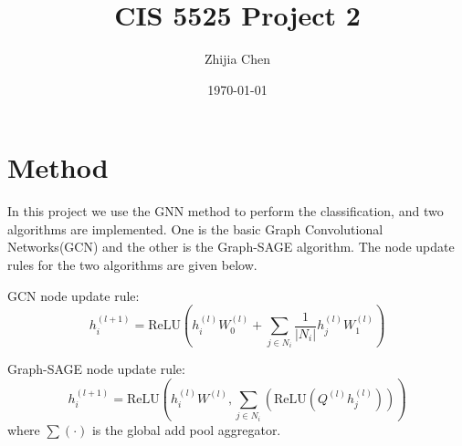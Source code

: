 \documentclass{article}
\title{CIS 5525 Project 2}
\author{Zhijia Chen}
\date{\today}
\begin{document}
\begin{titlepage}
    \maketitle
\end{titlepage}

\section{Method}

In this project we use the GNN method to perform the classification, and two algorithms are implemented. One is the basic Graph Convolutional Networks(GCN) and the other is the Graph-SAGE algorithm. The node update rules for the two algorithms are given below.

GCN node update rule: 
 \begin{equation}
    h_i^{(l+1)}=\text{ReLU} \left( h_i^{(l)}W_0^{(l)}+\sum_{j\in N_i}\frac{1}{|N_i|} h_j^{(l)}W_1^{(l)} \right)
\end{equation}

Graph-SAGE node update rule: 
\begin{equation}
    h_i^{(l+1)}=\text{ReLU} \left( h_i^{(l)}W^{(l)}, \sum_{j\in N_i} \left( \text{ReLU}(Q^{(l)}h_j^{(l)}) \right) \right)
\end{equation}
where $\sum\left( \cdot \right)$ is the global add pool aggregator.
\end{document}
